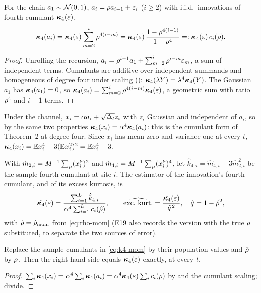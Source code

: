 \begin{lemma}
\label{lem:kappa4-site}
For the chain $a_1\sim\mathcal{N}\!\left(0,1\right)$, $a_i=\rho a_{i-1}+\varepsilon_i$ ($i\ge2$) with
i.i.d.\ innovations of fourth cumulant $\bm{\kappa}_4(\varepsilon)$,
\begin{equation}
  \bm{\kappa}_4(a_i)=\bm{\kappa}_4(\varepsilon)\sum_{m=2}^{i}\rho^{4(i-m)}
  =\bm{\kappa}_4(\varepsilon)\,\frac{1-\rho^{4(i-1)}}{1-\rho^4}=:\bm{\kappa}_4(\varepsilon)\,c_i(\rho).
  \label{eq:kappa4-site}
\end{equation}
\end{lemma}
\begin{proof}
Unrolling the recursion, $a_i=\rho^{i-1}a_1+\sum_{m=2}^{i}\rho^{i-m}\varepsilon_m$, a
sum of independent terms. Cumulants are additive over independent summands and
homogeneous of degree four under scaling ():
$\bm{\kappa}_4(\lambda Y)=\lambda^4\bm{\kappa}_4(Y)$. The Gaussian $a_1$ has $\bm{\kappa}_4(a_1)=0$, so
$\bm{\kappa}_4(a_i)=\sum_{m=2}^{i}\rho^{4(i-m)}\bm{\kappa}_4(\varepsilon)$, a geometric sum with ratio
$\rho^4$ and $i-1$ terms.
\end{proof}

Under the channel, $x_i=\alpha a_i+\sqrt{\Delta_t}z_i$ with $z_i$ Gaussian and independent of
$a_i$, so by the same two properties $\bm{\kappa}_4(x_i)=\alpha^4\bm{\kappa}_4(a_i)$: this is the
cumulant form of Theorem~2 at degree four. Since $x_i$ has mean zero and variance one at
every $t$, $\bm{\kappa}_4(x_i)=\mathbb{E} x_i^4-3(\mathbb{E} x_i^2)^2=\mathbb{E} x_i^4-3$.

\begin{definition}
\label{def:k4-mom}
With $\hat m_{2,i}=M^{-1}\sum_\mu(x^\mu_i)^2$ and $\hat m_{4,i}=M^{-1}\sum_\mu(x^\mu_i)^4$,
let $\hat k_{4,i}=\hat m_{4,i}-3\hat m_{2,i}^2$ be the sample fourth cumulant at site
$i$. The estimator of the innovation's fourth cumulant, and of its excess kurtosis, is
\begin{equation}
  \hat\kfour(\varepsilon)=\frac{\sum_{i=1}^{\nsites}\hat k_{4,i}}{\alpha^4\sum_{i=1}^{\nsites}c_i(\hat\corr)},
  \qquad
  \widehat{\text{exc.\ kurt.}}=\frac{\hat\kfour(\varepsilon)}{\hat\ivar^{\,2}},\quad
  \hat\ivar=1-\hat\corr^2 ,
  \label{eq:k4-mom}
\end{equation}
with $\hat{\rho}=\hat{\rho}_{\mathrm{mom}}$ from \cref{eq:rho-mom} (E19 also records the
version with the true $\rho$ substituted, to separate the two sources of error).
\end{definition}

\begin{proposition}
\label{prop:k4-unbiased}
Replace the sample cumulants in \cref{eq:k4-mom} by their population values and
$\hat{\rho}$ by $\rho$. Then the right-hand side equals $\bm{\kappa}_4(\varepsilon)$ exactly, at
every $t$.
\end{proposition}
\begin{proof}
$\sum_i\bm{\kappa}_4(x_i)=\alpha^4\sum_i\bm{\kappa}_4(a_i)=\alpha^4\bm{\kappa}_4(\varepsilon)\sum_ic_i(\rho)$
by  and the cumulant scaling; divide.
\end{proof}

